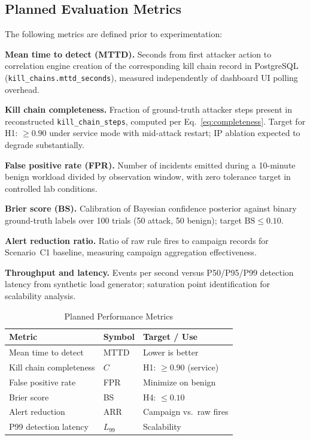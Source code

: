 \documentclass[conference]{IEEEtran}
\begin{document}
\subsection{Planned Evaluation Metrics}
The following metrics are defined prior to experimentation:

\textbf{Mean time to detect (MTTD).} Seconds from first attacker action to
correlation engine creation of the corresponding kill chain record in
PostgreSQL (\texttt{kill\_chains.mttd\_seconds}), measured independently of
dashboard UI polling overhead.

\textbf{Kill chain completeness.} Fraction of ground-truth attacker steps
present in reconstructed \texttt{kill\_chain\_steps}, computed per
Eq.~\eqref{eq:completeness}. Target for H1: $\geq 0.90$ under service mode
with mid-attack restart; IP ablation expected to degrade substantially.

\textbf{False positive rate (FPR).} Number of incidents emitted during a
10-minute benign workload divided by observation window, with zero tolerance
target in controlled lab conditions.

\textbf{Brier score (BS).} Calibration of Bayesian confidence posterior
against binary ground-truth labels over 100 trials (50 attack, 50 benign);
target $\text{BS} \leq 0.10$.

\textbf{Alert reduction ratio.} Ratio of raw rule fires to campaign records
for Scenario~C1 baseline, measuring campaign aggregation effectiveness.

\textbf{Throughput and latency.} Events per second versus P50/P95/P99
detection latency from synthetic load generator; saturation point
identification for scalability analysis.

\begin{table}[!t]
\caption{Planned Performance Metrics}
\label{tab:metrics}
\centering
\small
\begin{tabular}{lll}
\toprule
\textbf{Metric} & \textbf{Symbol} & \textbf{Target / Use} \\
\midrule
Mean time to detect       & MTTD  & Lower is better \\
Kill chain completeness   & $C$   & H1: $\geq 0.90$ (service) \\
False positive rate       & FPR   & Minimize on benign \\
Brier score               & BS    & H4: $\leq 0.10$ \\
Alert reduction           & ARR   & Campaign vs.\ raw fires \\
P99 detection latency     & $L_{99}$ & Scalability \\
\bottomrule
\end{tabular}
\end{table}
\end{document}
